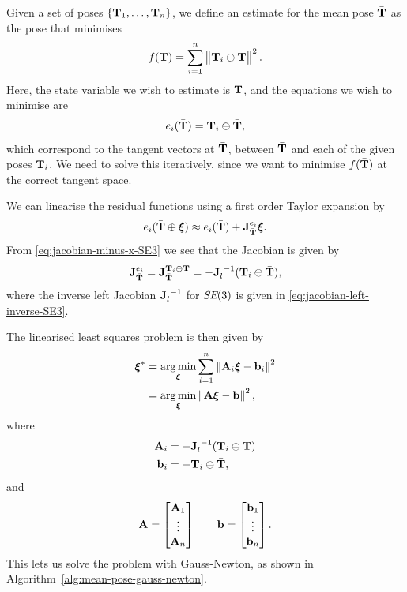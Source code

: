 \begin{example}[frametitle=Estimating the mean of a set of poses]
Given a set of poses $\{\matT_1, \ldots, \matT_n\}$, we define an estimate for the mean pose $\bar{\matT}$ as the pose that minimises
\begin{equation}
  f(\bar{\matT}) = \sum^n_{i=1} \norm{\matT_i \ominus \bar{\matT}}^2.
\end{equation}
Here, the state variable we wish to estimate is $\bar{\matT}$, and the equations we wish to minimise are
\begin{equation}
  e_i(\bar{\matT}) = \matT_i \ominus \bar{\matT},
\end{equation}
which correspond to the tangent vectors at $\bar{\matT}$, between $\bar{\matT}$ and each of the given poses $\matT_i$.
We need to solve this iteratively, since we want to minimise $f(\bar{\matT})$ at the correct tangent space.

We can linearise the residual functions using a first order Taylor expansion by
\begin{equation}
  e_i(\bar{\matT} \oplus \vecxi) \approx e_i(\bar{\matT}) + \jac{e_i}{\bar{\matT}} \vecxi.
\end{equation}
From \eqref{eq:jacobian-minus-x-SE3} we see that the Jacobian is given by
\begin{equation}
  \jac{e_i}{\bar{\matT}} = \jac{\matT_i \ominus \bar{\matT}}{\bar{\matT}} =  -\jac{}{l}^{-1}(\matT_i \ominus \bar{\matT}),
\end{equation}
where the inverse left Jacobian $\jac{}{l}^{-1}$ for $\SE(3)$ is given in \eqref{eq:jacobian-left-inverse-SE3}.

The linearised least squares problem is then given by
\begin{align} 
  \vecxi^\ast &= \argmin_{\vecxi} \sum^n_{i=1} \norm{\matA_i \vecxi - \vecb_i}^2 \label{eq:pose_mean_ls_sum}\\
  &= \argmin_{\vecxi} \norm{\matA \vecxi - \vecb}^2,
\end{align}
where
\begin{align}
  \matA_i &=  -\jac{}{l}^{-1}(\matT_i \ominus \bar{\matT}) \label{eq:pose-mean-A-lin}\\
  \vecb_i &= - \matT_i \ominus \bar{\matT} \label{eq:pose-mean-b-lin},
\end{align}
and
\begin{equation}
  \matA =  
  \begin{bmatrix}
    \matA_1\\
    \vdots\\
    \matA_n
  \end{bmatrix}
  \qquad
  \vecb =  
  \begin{bmatrix}
    \vecb_1\\
    \vdots\\
    \vecb_n
  \end{bmatrix}.
\end{equation}
This lets us solve the problem with Gauss-Newton, as shown in Algorithm~\ref{alg:mean-pose-gauss-newton}. 



\end{example}
